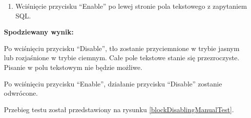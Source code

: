 \begin{enumerate}
\begin{enumerate}
\begin{enumerate}
                    \item Wciśnięcie przycisku ``Enable'' po lewej stronie pola
                        tekstowego z zapytaniem SQL.

                \end{enumerate}

                \textbf{Spodziewany wynik:}

                Po wciśnięciu przycisku ``Disable'', tło zostanie przyciemnione w
                trybie jasnym lub rozjaśnione w trybie ciemnym. Całe pole
                tekstowe stanie się przezroczyste. Pisanie w polu tekstowym nie
                będzie możliwe.

                Po wciśnięciu przycisku ``Enable'', działanie przycisku
                ``Disable'' zostanie odwrócone.

                Przebieg testu został przedstawiony na rysunku \ref{blockDisablingManualTest}.

                \begin{figure}[h]
                    \centering

                    \medspace



\end{figure}
\end{enumerate}
\end{enumerate}
